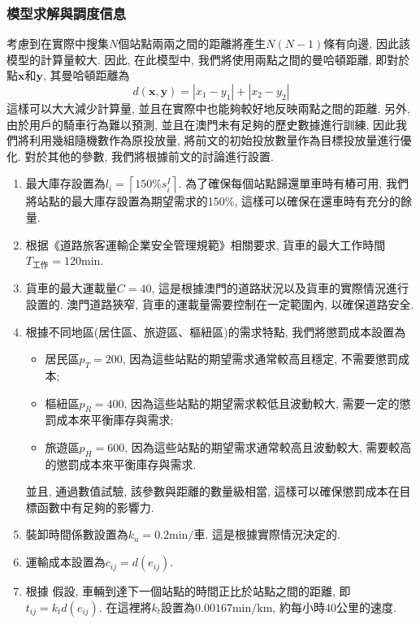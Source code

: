 \subsubsection{模型求解與調度信息}
考慮到在實際中搜集\(N\)個站點兩兩之間的距離將產生\(N(N-1)\)條有向邊, 因此該模型的計算量較大. 因此, 在此模型中, 我們將使用兩點之間的曼哈頓距離, 即對於點\(\mathbf{x}\)和\(\mathbf{y}\), 其曼哈頓距離為
\begin{equation}
d(\mathbf{x}, \mathbf{y}) = |x_1 - y_1| + |x_2 - y_2|
\end{equation}
這樣可以大大減少計算量, 並且在實際中也能夠較好地反映兩點之間的距離.
另外, 由於用戶的騎車行為難以預測, 並且在澳門未有足夠的歷史數據進行訓練, 因此我們將利用幾組隨機數作為原投放量, 將前文的初始投放數量作為目標投放量進行優化.
對於其他的參數, 我們將根據前文的討論進行設置. 
\begin{enumerate}
    \item 最大庫存設置為\(l_i=\left\lceil 150\% s_i^I  \right\rceil\).
    為了確保每個站點歸還單車時有樁可用, 我們將站點的最大庫存設置為期望需求的150\%, 這樣可以確保在還車時有充分的餘量.
    \item 根据《道路旅客運輸企業安全管理規範》相關要求, 貨車的最大工作時間\(T_\text{工作}= 120 \text{min}\).
    \item 貨車的最大運載量\(C= 40\), 這是根據澳門的道路狀況以及貨車的實際情況進行設置的. 澳門道路狹窄, 貨車的運載量需要控制在一定範圍內, 以確保道路安全.
    \item 根據不同地區(居住區、旅遊區、樞紐區)的需求特點, 我們將懲罰成本設置為
    \begin{itemize}
        \item 居民區\(p_T=200\), 因為這些站點的期望需求通常較高且穩定, 不需要懲罰成本;
        \item 樞紐區\(p_R=400\), 因為這些站點的期望需求較低且波動較大, 需要一定的懲罰成本來平衡庫存與需求;
        \item 旅遊區\(p_H=600\), 因為這些站點的期望需求通常較高且波動較大, 需要較高的懲罰成本來平衡庫存與需求.
    \end{itemize}
    並且, 通過數值試驗, 該參數與距離的數量級相當, 這樣可以確保懲罰成本在目標函數中有足夠的影響力.
    \item 裝卸時間係數設置為\(k_u = 0.2 \text{min/車}\). 這是根據實際情況決定的.
    \item 運輸成本設置為\(c_{ij} = d(e_{ij})\). 
    \item 根據{\color{red} \Large 假設}, 車輛到達下一個站點的時間正比於站點之間的距離, 即\(t_{ij} = k_td(e_{ij})\). 在這裡將\(k_t\)設置為\(0.00167\text{min/km}\), 約每小時40公里的速度.
\end{enumerate}
